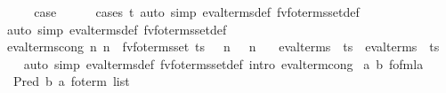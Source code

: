 \begin{isabellebody}
\ \ \isamarkupfalse%
\ \isamarkupfalse%
\ {\isacharquery}{\kern0pt}case\isanewline
\ \ \ \ \isamarkupfalse%
\ {\isacharparenleft}{\kern0pt}cases\ t{\isacharparenright}{\kern0pt}\ {\isacharparenleft}{\kern0pt}auto\ simp{\isacharcolon}{\kern0pt}\ eval{\isacharunderscore}{\kern0pt}terms{\isacharunderscore}{\kern0pt}def\ fv{\isacharunderscore}{\kern0pt}fo{\isacharunderscore}{\kern0pt}terms{\isacharunderscore}{\kern0pt}set{\isacharunderscore}{\kern0pt}def{\isacharparenright}{\kern0pt}\isanewline
{}\isamarkupfalse%
\ {\isacharparenleft}{\kern0pt}auto\ simp{\isacharcolon}{\kern0pt}\ eval{\isacharunderscore}{\kern0pt}terms{\isacharunderscore}{\kern0pt}def\ fv{\isacharunderscore}{\kern0pt}fo{\isacharunderscore}{\kern0pt}terms{\isacharunderscore}{\kern0pt}set{\isacharunderscore}{\kern0pt}def{\isacharparenright}{\kern0pt}%
\endisatagproof
{\isafoldproof}%
%
\isadelimproof
\isanewline
%
\endisadelimproof
\isanewline
{}\isamarkupfalse%
\ eval{\isacharunderscore}{\kern0pt}terms{\isacharunderscore}{\kern0pt}cong{\isacharcolon}{\kern0pt}\ {\isachardoublequoteopen}{\isacharparenleft}{\kern0pt}{\isasymAnd}n{\isachardot}{\kern0pt}\ n\ {\isasymin}\ fv{\isacharunderscore}{\kern0pt}fo{\isacharunderscore}{\kern0pt}terms{\isacharunderscore}{\kern0pt}set\ ts\ {\isasymLongrightarrow}\ {\isasymsigma}\ n\ {\isacharequal}{\kern0pt}\ {\isasymsigma}{\isacharprime}{\kern0pt}\ n{\isacharparenright}{\kern0pt}\ {\isasymLongrightarrow}\isanewline
\ \ eval{\isacharunderscore}{\kern0pt}terms\ {\isasymsigma}\ ts\ {\isacharequal}{\kern0pt}\ eval{\isacharunderscore}{\kern0pt}terms\ {\isasymsigma}{\isacharprime}{\kern0pt}\ ts{\isachardoublequoteclose}\isanewline
%
\isadelimproof
\ \ %
\endisadelimproof
%
\isatagproof
{}\isamarkupfalse%
\ {\isacharparenleft}{\kern0pt}auto\ simp{\isacharcolon}{\kern0pt}\ eval{\isacharunderscore}{\kern0pt}terms{\isacharunderscore}{\kern0pt}def\ fv{\isacharunderscore}{\kern0pt}fo{\isacharunderscore}{\kern0pt}terms{\isacharunderscore}{\kern0pt}set{\isacharunderscore}{\kern0pt}def\ intro{\isacharcolon}{\kern0pt}\ eval{\isacharunderscore}{\kern0pt}term{\isacharunderscore}{\kern0pt}cong{\isacharparenright}{\kern0pt}%
\endisatagproof
{\isafoldproof}%
%
\isadelimproof
\isanewline
%
\endisadelimproof
\isanewline
{}\isamarkupfalse%
\ {\isacharparenleft}{\kern0pt}{\isacharprime}{\kern0pt}a{\isacharcomma}{\kern0pt}\ {\isacharprime}{\kern0pt}b{\isacharparenright}{\kern0pt}\ fo{\isacharunderscore}{\kern0pt}fmla\ {\isacharequal}{\kern0pt}\isanewline
\ \ Pred\ {\isacharprime}{\kern0pt}b\ {\isachardoublequoteopen}{\isacharparenleft}{\kern0pt}{\isacharprime}{\kern0pt}a\ fo{\isacharunderscore}{\kern0pt}term{\isacharparenright}{\kern0pt}\ list{\isachardoublequoteclose}\isanewline

\end{isabellebody}
